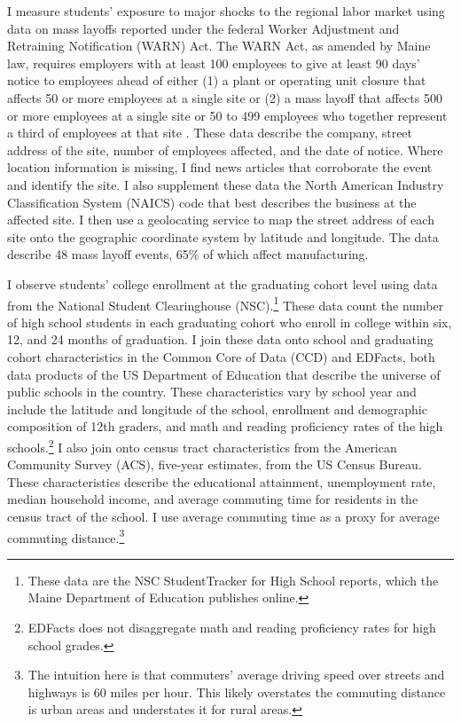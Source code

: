 \documentclass[12pt,letterpaper]{article}
\begin{document}
I measure students' exposure to major shocks to the regional labor market using data on mass layoffs reported under the federal Worker Adjustment and Retraining Notification (WARN) Act. The WARN Act, as amended by Maine law, requires employers with at least 100 employees to give at least 90 days' notice to employees ahead of either (1) a plant or operating unit closure that affects 50 or more employees at a single site or (2) a mass layoff that affects 500 or more employees at a single site or 50 to 499 employees who together represent a third of employees at that site \cite{maine:warn}. These data describe the company, street address of the site, number of employees affected, and the date of notice. Where location information is missing, I find news articles that corroborate the event and identify the site. I also supplement these data the North American Industry Classification System (NAICS) code that best describes the business at the affected site. I then use a geolocating service to map the street address of each site onto the geographic coordinate system by latitude and longitude. The data describe 48 mass layoff events, 65\% of which affect manufacturing.

I observe students' college enrollment at the graduating cohort level using data from the National Student Clearinghouse (NSC).\footnote{These data are the NSC StudentTracker for High School reports, which the Maine Department of Education publishes online.} These data count the number of high school students in each graduating cohort who enroll in college within six, 12, and 24 months of graduation. I join these data onto school and graduating cohort characteristics in the Common Core of Data (CCD) and EDFacts, both data products of the US Department of Education that describe the universe of public schools in the country. These characteristics vary by school year and include the latitude and longitude of the school, enrollment and demographic composition of 12th graders, and math and reading proficiency rates of the high schools.\footnote{EDFacts does not disaggregate math and reading proficiency rates for high school grades.} I also join onto census tract characteristics from the American Community Survey (ACS), five-year estimates, from the US Census Bureau. These characteristics describe the educational attainment, unemployment rate, median household income, and average commuting time for residents in the census tract of the school. I use average commuting time as a proxy for average commuting distance.\footnote{The intuition here is that commuters' average driving speed over streets and highways is 60 miles per hour. This likely overstates the commuting distance is urban areas and understates it for rural areas.}
\end{document}
